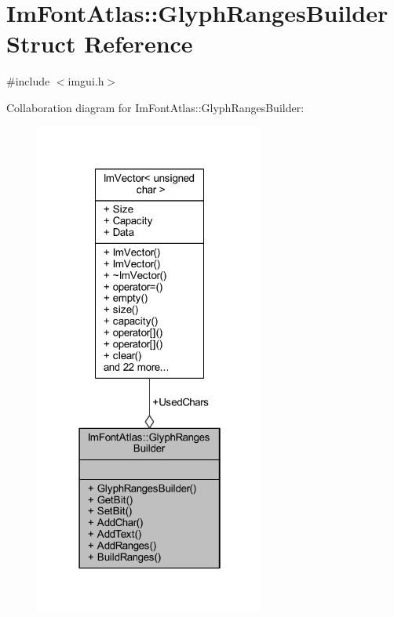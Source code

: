 \hypertarget{struct_im_font_atlas_1_1_glyph_ranges_builder}{}\section{Im\+Font\+Atlas\+:\+:Glyph\+Ranges\+Builder Struct Reference}
\label{struct_im_font_atlas_1_1_glyph_ranges_builder}


{\ttfamily \#include $<$imgui.\+h$>$}



Collaboration diagram for Im\+Font\+Atlas\+:\+:Glyph\+Ranges\+Builder\+:
\nopagebreak
\begin{figure}[H]
\begin{center}
\leavevmode
\includegraphics[width=214pt]{struct_im_font_atlas_1_1_glyph_ranges_builder__coll__graph}
\end{center}
\end{figure}
